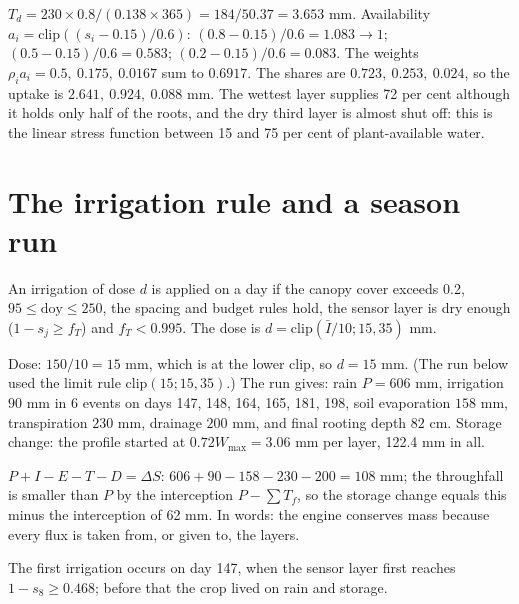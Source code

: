 \sol  $T_d=230\times0.8/(0.138\times365)=184/50.37=3.653$ mm. Availability $a_i=\mathrm{clip}((s_i-0.15)/0.6)$: $(0.8-0.15)/0.6=1.083\to1$; $(0.5-0.15)/0.6=0.583$; $(0.2-0.15)/0.6=0.083$. The weights $\rho_ia_i=0.5,\ 0.175,\ 0.0167$ sum to $0.6917$. The shares are $0.723,\ 0.253,\ 0.024$, so the uptake is $2.641,\ 0.924,\ 0.088$ mm. The wettest layer supplies 72 per cent although it holds only half of the roots, and the dry third layer is almost shut off: this is the linear stress function between 15 and 75 per cent of plant-available water.


\section{The irrigation rule and a season run}
An irrigation of dose $d$ is applied on a day if the canopy cover exceeds 0.2, $95\le\mathrm{doy}\le250$, the spacing and budget rules hold, the sensor layer is dry enough ($1-s_j\ge f_T$) and $f_T<0.995$. The dose is $d=\mathrm{clip}(\bar I/10;15,35)$ mm.

\sol  Dose: $150/10=15$ mm, which is at the lower clip, so $d=15$ mm. (The run below used the limit rule $\mathrm{clip}(15;15,35)$.) The run gives: rain $P=606$ mm, irrigation $90$ mm in 6 events on days 147, 148, 164, 165, 181, 198, soil evaporation $158$ mm, transpiration $230$ mm, drainage $200$ mm, and final rooting depth $82$ cm. Storage change: the profile started at $0.72W_{\max}=3.06$ mm per layer, 122.4 mm in all.

 $P+I-E-T-D=\Delta S$: $606+90-158-230-200=108$ mm; the throughfall is smaller than $P$ by the interception $P-\sum T_f$, so the storage change equals this minus the interception of 62 mm. In words: the engine conserves mass because every flux is taken from, or given to, the layers.\par
The first irrigation occurs on day 147, when the sensor layer first reaches $1-s_8\ge0.468$; before that the crop lived on rain and storage.


